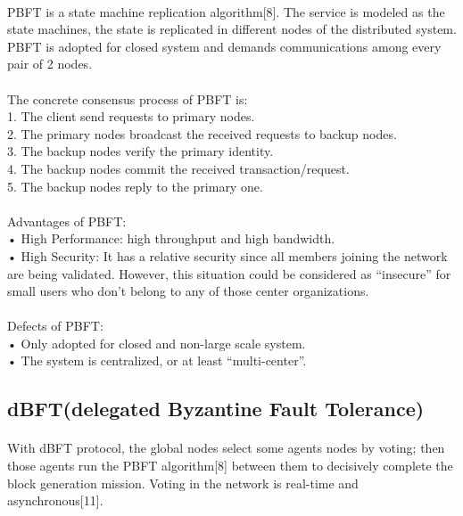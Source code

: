 \documentclass[doublespacing]{bmcart}
\begin{document}
\begin{CJK*}{UTF8}{gbsn}
	\paragraph{} 
	PBFT is a state machine replication algorithm[8]. The service is modeled as the state machines, the state is replicated in different nodes of the distributed system. PBFT is adopted for closed system and demands communications among every pair of 2 nodes.
	\paragraph{} 
	The concrete consensus process of PBFT is:
\\1. The client send requests to primary nodes.
\\2. The primary nodes broadcast the received requests to backup nodes.
\\3. The backup nodes verify the primary identity.
\\4. The backup nodes commit the received transaction/request.
\\5. The backup nodes reply to the primary one.
	
\paragraph{} 
Advantages of PBFT:
\\• High Performance: high throughput and high bandwidth.
\\• High Security: It has a relative security since all members joining the network are being validated. However, this situation could be considered as ``insecure'' for small users who don't belong to any of those center organizations.
	\paragraph{} 
Defects of PBFT:	
\\• Only adopted for closed and non-large scale system.
\\• The system is centralized, or at least ``multi-center''.
	
	\subsection{dBFT(delegated Byzantine Fault Tolerance)}
	\paragraph{} 
	With dBFT protocol, the global nodes select some agents nodes by voting; then those agents run the PBFT algorithm[8] between them to decisively complete the block generation mission. Voting in the network is real-time and asynchronous[11].
	

\end{CJK*}
\end{document}
